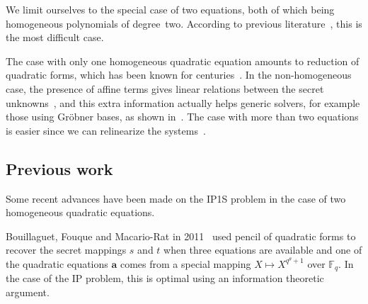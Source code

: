 \documentclass{article}%
\def\F{\mathbb{F}}
\begin{document}
We limit ourselves to the special case of two equations, both of which
being homogeneous polynomials of degree~two. According to previous
literature~\cite{DBLP:conf/eurocrypt/Perret05,DBLP:conf/eurocrypt/FaugereP06,DBLP:conf/pkc/BouillaguetFFP11,DBLP:conf/eurocrypt/BouillaguetFV13},
this is the most difficult case.

The case with only one homogeneous quadratic equation amounts to 
reduction of quadratic forms, which has been known for
centuries~\cite{gauss,lidl1997finite}. In the non-homogeneous case, the
presence of affine terms gives linear relations between the secret
unknowns~\cite{DBLP:conf/eurocrypt/PatarinGC98}, and this extra
information actually helps generic solvers, for example those using
Gröbner bases, as shown in~\cite{DBLP:conf/eurocrypt/FaugereP06}.
The case with more than two equations is easier since we can relinearize
the systems~\cite{DBLP:conf/pkc/BouillaguetFFP11}.

\subsection*{Previous work}%

Some recent advances have been made on the IP1S problem in the case of
two
homogeneous quadratic equations.


Bouillaguet, Fouque and Macario-Rat in 2011~\cite{DBLP:conf/asiacrypt/BouillaguetFM11} 
used pencil of quadratic forms to recover the secret mappings $s$ and $t$
when three equations are available
and one of the quadratic equations $\bm{a}$ comes from a special mapping $X\mapsto X^{q^\theta+1}$ 
over $\F_q$. In the case of the IP problem, this is optimal using an information theoretic argument.
\end{document}
